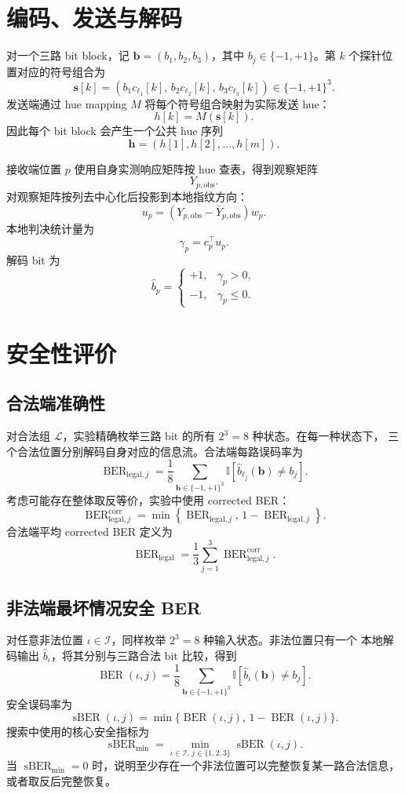 \documentclass[UTF8,a4paper,11pt]{ctexart}
\newcommand{\BER}{\operatorname{BER}}
\newcommand{\sBER}{\operatorname{sBER}}
\begin{document}
\section{编码、发送与解码}

对一个三路 bit block，记 $\mathbf{b}=(b_1,b_2,b_3)$，其中
$b_j\in\{-1,+1\}$。第 $k$ 个探针位置对应的符号组合为
\[
\mathbf{s}[k]=
\left(b_1c_{\ell_1}[k],\,b_2c_{\ell_2}[k],\,b_3c_{\ell_3}[k]\right)
\in\{-1,+1\}^3.
\]
发送端通过 hue mapping $M$ 将每个符号组合映射为实际发送 hue：
\[
h[k]=M(\mathbf{s}[k]).
\]
因此每个 bit block 会产生一个公共 hue 序列
\[
\mathbf{h}=(h[1],h[2],\ldots,h[m]).
\]

接收端位置 $p$ 使用自身实测响应矩阵按 hue 查表，得到观察矩阵
\[
Y_{p,\mathrm{obs}}.
\]
对观察矩阵按列去中心化后投影到本地指纹方向：
\[
u_p=(Y_{p,\mathrm{obs}}-\bar{Y}_{p,\mathrm{obs}})w_p.
\]
本地判决统计量为
\[
\gamma_p=c_p^\top u_p.
\]
解码 bit 为
\[
\hat{b}_p=
\begin{cases}
+1, & \gamma_p>0,\\
-1, & \gamma_p\leq 0.
\end{cases}
\]

\section{安全性评价}

\subsection{合法端准确性}

对合法组 $\mathcal{L}$，实验精确枚举三路 bit 的所有 $2^3=8$ 种状态。在每一种状态下，
三个合法位置分别解码自身对应的信息流。合法端每路误码率为
\[
\BER_{\mathrm{legal},j}
=\frac{1}{8}\sum_{\mathbf{b}\in\{-1,+1\}^3}
\mathbb{I}\left[\hat{b}_{\ell_j}(\mathbf{b})\neq b_j\right].
\]
考虑可能存在整体取反等价，实验中使用 corrected BER：
\[
\BER_{\mathrm{legal},j}^{\mathrm{corr}}
=\min\left\{\BER_{\mathrm{legal},j},\,1-\BER_{\mathrm{legal},j}\right\}.
\]
合法端平均 corrected BER 定义为
\[
\BER_{\mathrm{legal}}
=\frac{1}{3}\sum_{j=1}^3
\BER_{\mathrm{legal},j}^{\mathrm{corr}}.
\]

\subsection{非法端最坏情况安全 BER}

对任意非法位置 $\iota\in\mathcal{I}$，同样枚举 $2^3=8$ 种输入状态。非法位置只有一个
本地解码输出 $\hat{b}_{\iota}$，将其分别与三路合法 bit 比较，得到
\[
\BER(\iota,j)
=\frac{1}{8}\sum_{\mathbf{b}\in\{-1,+1\}^3}
\mathbb{I}\left[\hat{b}_{\iota}(\mathbf{b})\neq b_j\right].
\]
安全误码率为
\[
\sBER(\iota,j)=\min\{\BER(\iota,j),\,1-\BER(\iota,j)\}.
\]
搜索中使用的核心安全指标为
\[
\sBER_{\min}
=\min_{\iota\in\mathcal{I},\,j\in\{1,2,3\}}\sBER(\iota,j).
\]
当 $\sBER_{\min}=0$ 时，说明至少存在一个非法位置可以完整恢复某一路合法信息，或者取反后完整恢复。
\end{document}
